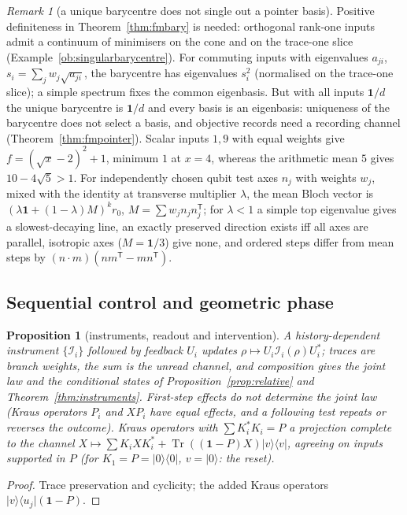 \documentclass[aps,pra,onecolumn,superscriptaddress,nofootinbib,10pt]{revtex4-2}
\newtheorem{proposition}[theorem]{Proposition}
\theoremstyle{definition}
\theoremstyle{remark}
\newtheorem{remark}[theorem]{Remark}
\newcommand{\tr}{\operatorname{Tr}}
\begin{document}
\begin{remark}[a unique barycentre does not single out a pointer basis]\label{rem:fmaxisbary}
Positive definiteness in Theorem~\ref{thm:fmbary} is needed: orthogonal rank-one inputs admit a continuum of
minimisers on the cone and on the trace-one slice (Example~\ref{ob:singularbarycentre}).  For commuting inputs with eigenvalues $a_{ji}$, $s_i=\sum_jw_j\sqrt{a_{ji}}$, the barycentre has eigenvalues $s_i^2$ (normalised on the trace-one
slice); a simple spectrum fixes the common eigenbasis.  But with all inputs $\mathbf1/d$ the unique barycentre is $\mathbf1/d$
and every basis is an eigenbasis: uniqueness of the barycentre does not select a basis, and objective
records need a recording channel (Theorem~\ref{thm:fmpointer}).  Scalar inputs $1,9$ with equal weights give
$f=(\sqrt x-2)^2+1$, minimum $1$ at $x=4$, whereas the arithmetic mean $5$ gives $10-4\sqrt5>1$.  For independently chosen qubit
test axes $n_j$ with weights $w_j$, mixed with the identity at transverse multiplier $\lambda$, the mean Bloch vector is
$(\lambda\mathbf1+(1-\lambda)M)^kr_0$, $M=\sum w_jn_jn_j^{\mathsf T}$; for $\lambda<1$ a simple top eigenvalue gives a slowest-decaying line, an exactly
preserved direction exists iff all axes are parallel, isotropic axes ($M=\mathbf1/3$) give none, and ordered steps
differ from mean steps by $(n\cdot m)(nm^{\mathsf T}-mn^{\mathsf T})$.
\end{remark}

\subsection{Sequential control and geometric phase}\label{sec:fmcontrol}

\begin{proposition}[instruments, readout and intervention]\label{prop:fminstrument}
A history-dependent instrument $\{\mathcal I_i\}$ followed by feedback $U_i$ updates $\rho\mapsto U_i\mathcal I_i(\rho)U_i^*$; traces are branch weights,
the sum is the unread channel, and composition gives the joint law and the conditional states of
Proposition~\ref{prop:relative} and Theorem~\ref{thm:instruments}.  First-step effects do not determine the joint
law (Kraus operators $P_i$ and $XP_i$ have equal effects, and a following test repeats or reverses the
outcome).  Kraus operators with $\sum K_i^*K_i=P$ a projection complete to the channel
$X\mapsto\sum K_iXK_i^*+\tr((\mathbf1-P)X)\lvert v\rangle\langle v\rvert$, agreeing on inputs supported in $P$ (for $K_1=P=\lvert0\rangle\langle0\rvert$, $v=\lvert0\rangle$: the reset).
\end{proposition}
\begin{proof}
Trace preservation and cyclicity; the added Kraus operators $\lvert v\rangle\langle u_j\rvert(\mathbf1-P)$.
\end{proof}
\end{document}

